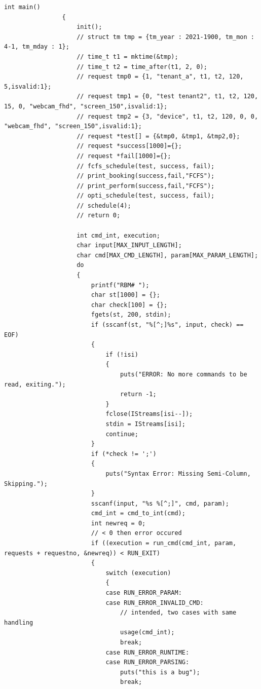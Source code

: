 \documentclass{article}
\begin{document}
\begin{Verbatim}[gobble=8]
                int main()
                {
                    init();
                    // struct tm tmp = {tm_year : 2021-1900, tm_mon : 4-1, tm_mday : 1};
                    // time_t t1 = mktime(&tmp);
                    // time_t t2 = time_after(t1, 2, 0);
                    // request tmp0 = {1, "tenant_a", t1, t2, 120, 5,isvalid:1};
                    // request tmp1 = {0, "test tenant2", t1, t2, 120, 15, 0, "webcam_fhd", "screen_150",isvalid:1};
                    // request tmp2 = {3, "device", t1, t2, 120, 0, 0, "webcam_fhd", "screen_150",isvalid:1};
                    // request *test[] = {&tmp0, &tmp1, &tmp2,0};
                    // request *success[1000]={};
                    // request *fail[1000]={};
                    // fcfs_schedule(test, success, fail);
                    // print_booking(success,fail,"FCFS");
                    // print_perform(success,fail,"FCFS");
                    // opti_schedule(test, success, fail);
                    // schedule(4);
                    // return 0;
                
                    int cmd_int, execution;
                    char input[MAX_INPUT_LENGTH];
                    char cmd[MAX_CMD_LENGTH], param[MAX_PARAM_LENGTH];
                    do
                    {
                        printf("RBM# ");
                        char st[1000] = {};
                        char check[100] = {};
                        fgets(st, 200, stdin);
                        if (sscanf(st, "%[^;]%s", input, check) == EOF)
                        {
                            if (!isi)
                            {
                                puts("ERROR: No more commands to be read, exiting.");
                                return -1;
                            }
                            fclose(IStreams[isi--]);
                            stdin = IStreams[isi];
                            continue;
                        }
                        if (*check != ';')
                        {
                            puts("Syntax Error: Missing Semi-Column, Skipping.");
                        }
                        sscanf(input, "%s %[^;]", cmd, param);
                        cmd_int = cmd_to_int(cmd);
                        int newreq = 0;
                        // < 0 then error occured
                        if ((execution = run_cmd(cmd_int, param, requests + requestno, &newreq)) < RUN_EXIT)
                        {
                            switch (execution)
                            {
                            case RUN_ERROR_PARAM:
                            case RUN_ERROR_INVALID_CMD:
                                // intended, two cases with same handling
                                usage(cmd_int);
                                break;
                            case RUN_ERROR_RUNTIME:
                            case RUN_ERROR_PARSING:
                                puts("this is a bug");
                                break;
                

\end{Verbatim}
\end{document}
